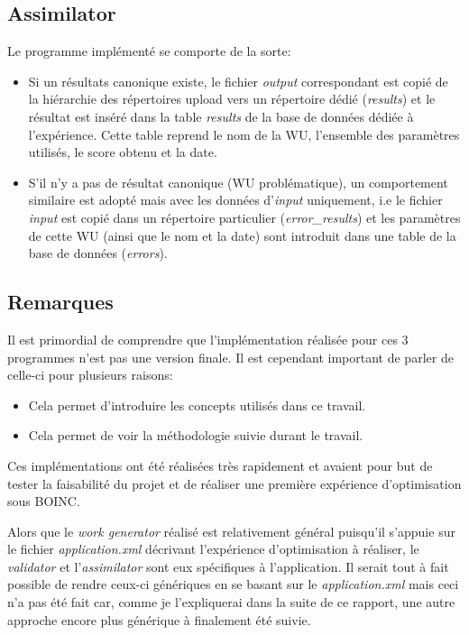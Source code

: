 \documentclass[a4paper, 11pt]{article}
\begin{document}
\subsection{Assimilator}
Le programme implémenté se comporte de la sorte:
\begin{itemize}
\item Si un résultats canonique existe, le fichier \textit{output} correspondant est copié de la hiérarchie des répertoires upload vers un répertoire dédié (\textit{results}) et le résultat est inséré dans la table \textit{results} de la base de données dédiée à l'expérience. Cette table reprend le nom de la WU, l'ensemble des paramètres utilisés, le score obtenu et la date. %
\item S'il n'y a pas de résultat canonique (WU problématique), un comportement similaire est adopté mais avec les données d'\textit{input} uniquement, i.e le fichier \textit{input} est copié dans un répertoire particulier (\textit{error\_results}) et les paramètres  de cette WU (ainsi que le nom et la date) sont introduit dans une table de la base de données (\textit{errors}).
\end{itemize}

\subsection{Remarques}
Il est primordial de comprendre que l'implémentation réalisée pour ces 3 programmes n'est pas une version finale. Il est cependant important de parler de celle-ci pour plusieurs raisons:
\begin{itemize}
\item Cela permet d'introduire les concepts utilisés dans ce travail.
\item Cela permet de voir la méthodologie suivie durant le travail. %
\end{itemize}

Ces implémentations ont été réalisées très rapidement et avaient pour but de tester la faisabilité du projet et de réaliser une première expérience d'optimisation sous \textsc{BOINC}.

Alors que le \textit{work generator} réalisé est relativement général puisqu'il s'appuie sur le fichier \textit{application.xml} décrivant l'expérience d'optimisation à réaliser, le \textit{validator} et l'\textit{assimilator} sont eux spécifiques à l'application. Il serait tout à fait possible de rendre ceux-ci génériques en se basant sur le \textit{application.xml} mais ceci n'a pas été fait car, comme je l'expliquerai dans la suite de ce rapport, une autre approche encore plus générique à finalement été suivie.
\end{document}
